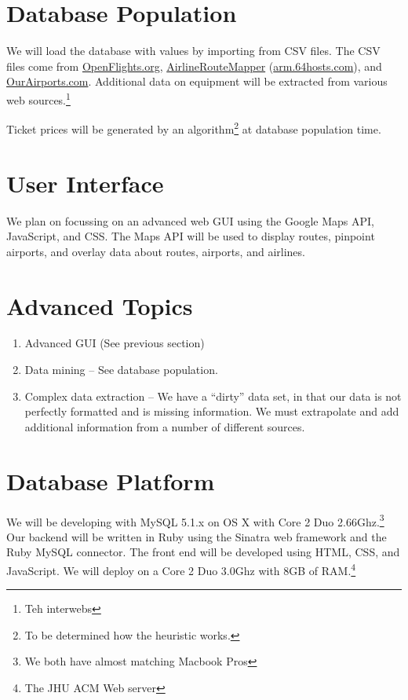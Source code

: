 \documentclass[12pt]{article}
\begin{document}
  \section{Database Population}
    We will load the database with values by importing from CSV files. The CSV files come from \href{http://www.openflights.org}{OpenFlights.org}, \href{http://www.arm.64hosts.com}{AirlineRouteMapper} (\url{arm.64hosts.com}), and \href{http://www.ourairports.com}{OurAirports.com}.  Additional data on equipment will be extracted from various web sources.\footnote{Teh interwebs}
    
    Ticket prices will be generated by an algorithm\footnote{To be determined how the heuristic works.} at database population time.
  \section{User Interface}
  We plan on focussing on an advanced web GUI using the Google Maps API, JavaScript, and CSS. The Maps API will be used to display routes, pinpoint airports, and overlay data about routes, airports, and airlines.
  \section{Advanced Topics}
    \begin{enumerate}
      \item Advanced GUI (See previous section)
      \item Data mining -- See database population.
      \item Complex data extraction -- We have a ``dirty'' data set, in that our data is not perfectly formatted and is missing information. We must extrapolate and add additional information from a number of different sources.
    \end{enumerate}
  \section{Database Platform}
  We will be developing with MySQL 5.1.x on OS X with Core 2 Duo 2.66Ghz.\footnote{We both have almost matching Macbook Pros} Our backend will be written in Ruby using the Sinatra web framework and the Ruby MySQL connector. The front end will be developed using HTML, CSS, and JavaScript. We will deploy on a Core 2 Duo 3.0Ghz with 8GB of RAM.\footnote{The JHU ACM Web server}
\end{document}
